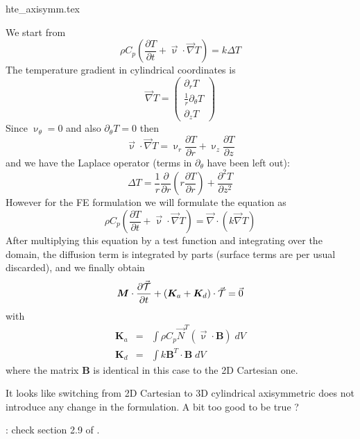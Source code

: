 \begin{flushright} {\tiny {\color{gray} hte\_axisymm.tex}} \end{flushright}

We start from
\[
\rho C_p \left(\frac{\partial T}{\partial t} 
+\vec\upnu\cdot\vec\nabla T \right)
= k \Delta T
\]
The temperature gradient in cylindrical coordinates is 
\[
\vec\nabla T = 
\left(
\begin{array}{c}
\partial_r T \\
\frac{1}{r}\partial_\theta T \\
\partial_z T 
\end{array}
\right)
\]
Since $\upnu_\theta=0$ and also $\partial_\theta T=0$ then 
\[
\vec\upnu\cdot\vec\nabla T = \upnu_r \frac{\partial T}{\partial r}
+ \upnu_z \frac{\partial T}{\partial z}
\]
and we have the Laplace operator (terms in $\partial_\theta$ have 
been left out):
\[
\Delta T = \frac{1}{r} \frac{\partial }{\partial r}
\left(r \frac{\partial T}{\partial r} \right)
+\frac{\partial^2 T }{\partial z^2}
\]
However for the FE formulation we will formulate the equation as
\[
\rho C_p \left(\frac{\partial T}{\partial t} 
+\vec\upnu\cdot\vec\nabla T \right)
= \vec\nabla \cdot (k \vec\nabla T)
\]
After multiplying this equation by a test function and integrating over the domain, the diffusion term is integrated by parts (surface terms are per usual discarded), and we finally obtain
\[
{\bm M} \cdot \frac{\partial \vec{\cal T}}{\partial t}
+
({\bm K}_a + {\bm K}_d ) \cdot \vec{\cal T} = \vec{0}
\]
with
\begin{eqnarray}
{\bm K}_a &=& \int \rho C_p \vec    {N}^T (\vec\upnu\cdot {\bm B}) \; dV \\
{\bm K}_d &=& \int k {\bm B}^T \cdot {\bm B} \; dV 
\end{eqnarray}
where the matrix ${\bm B}$ is identical in this case to the 2D Cartesian one.

It looks like switching from 2D Cartesian to 3D cylindrical axisymmetric does not introduce any change in the formulation.
A bit too good to be true ?


\Literature:
check section 2.9 of  
.
